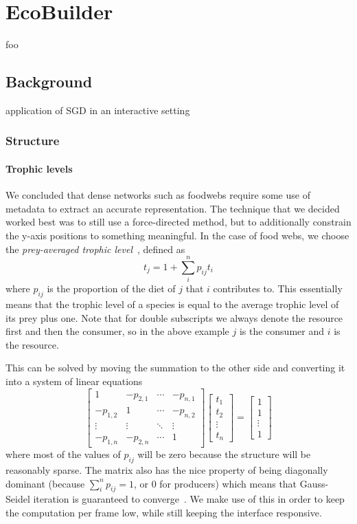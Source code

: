 \chapter{EcoBuilder}
foo
\label{chap:joy}

\section{Background}
application of SGD in an interactive setting

\subsection{Structure}
\subsubsection{Trophic levels}
We concluded that dense networks such as foodwebs require some use of metadata to extract an accurate representation.
The technique that we decided worked best was to still use a force-directed method, but to additionally constrain the y-axis positions to something meaningful. In the case of food webs, we choose the
\emph{prey-averaged trophic level}~\cite{trophic}, defined as
\begin{equation}
    t_j = 1 + \sum_i^n p_{ij}t_i
\end{equation}
where $p_{ij}$ is the proportion of the diet of $j$ that $i$ contributes to. This essentially means that the trophic level of a species is equal to the average trophic level of its prey plus one.
Note that for double subscripts we always denote the resource first and then the consumer, so in the above example $j$ is the consumer and $i$ is the resource.

This can be solved by moving the summation to the other side and converting it into a system of linear equations
\begin{equation}
    \begin{bmatrix}
    1&-p_{2,1}&\cdots&-p_{n,1}\\
    -p_{1,2}&1&\cdots&-p_{n,2}\\
    \vdots&\vdots&\ddots&\vdots\\
    -p_{1,n}&-p_{2,n}&\cdots&1
    \end{bmatrix}
    \begin{bmatrix}
    t_1\\t_2\\\vdots\\t_n
    \end{bmatrix}
    =
    \begin{bmatrix}
    1\\1\\\vdots\\1
    \end{bmatrix}
\end{equation}
where most of the values of $p_{ij}$ will be zero because the structure will be reasonably sparse.
The matrix also has the nice property of being diagonally dominant (because $\sum_i^np_{ij} = 1$, or $0$ for producers) which means that Gauss-Seidel iteration is guaranteed to converge~\cite{gaussseidel}. We make use of this in order to keep the computation per frame low, while still keeping the interface responsive.

